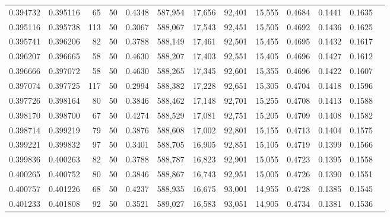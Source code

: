 \begin{tabular}{rrrrrrrrrrrrr}
0.394732 & 0.395116 &    65 &  50 &                                     0.4348 & 587,954 &  17,656 &  92,401 &  15,555 & 0.4684 & 0.1441 & 0.1635 \\
0.395116 & 0.395738 &   113 &  50 &                                     0.3067 & 588,067 &  17,543 &  92,451 &  15,505 & 0.4692 & 0.1436 & 0.1625 \\
0.395741 & 0.396206 &    82 &  50 &                                     0.3788 & 588,149 &  17,461 &  92,501 &  15,455 & 0.4695 & 0.1432 & 0.1617 \\
0.396207 & 0.396665 &    58 &  50 &                                     0.4630 & 588,207 &  17,403 &  92,551 &  15,405 & 0.4696 & 0.1427 & 0.1612 \\
0.396666 & 0.397072 &    58 &  50 &                                     0.4630 & 588,265 &  17,345 &  92,601 &  15,355 & 0.4696 & 0.1422 & 0.1607 \\
0.397074 & 0.397725 &   117 &  50 &                                     0.2994 & 588,382 &  17,228 &  92,651 &  15,305 & 0.4704 & 0.1418 & 0.1596 \\
0.397726 & 0.398164 &    80 &  50 &                                     0.3846 & 588,462 &  17,148 &  92,701 &  15,255 & 0.4708 & 0.1413 & 0.1588 \\
0.398170 & 0.398700 &    67 &  50 &                                     0.4274 & 588,529 &  17,081 &  92,751 &  15,205 & 0.4709 & 0.1408 & 0.1582 \\
0.398714 & 0.399219 &    79 &  50 &                                     0.3876 & 588,608 &  17,002 &  92,801 &  15,155 & 0.4713 & 0.1404 & 0.1575 \\
0.399221 & 0.399832 &    97 &  50 &                                     0.3401 & 588,705 &  16,905 &  92,851 &  15,105 & 0.4719 & 0.1399 & 0.1566 \\
0.399836 & 0.400263 &    82 &  50 &                                     0.3788 & 588,787 &  16,823 &  92,901 &  15,055 & 0.4723 & 0.1395 & 0.1558 \\
0.400265 & 0.400752 &    80 &  50 &                                     0.3846 & 588,867 &  16,743 &  92,951 &  15,005 & 0.4726 & 0.1390 & 0.1551 \\
0.400757 & 0.401226 &    68 &  50 &                                     0.4237 & 588,935 &  16,675 &  93,001 &  14,955 & 0.4728 & 0.1385 & 0.1545 \\
0.401233 & 0.401808 &    92 &  50 &                                     0.3521 & 589,027 &  16,583 &  93,051 &  14,905 & 0.4734 & 0.1381 & 0.1536 \\

\end{tabular}
